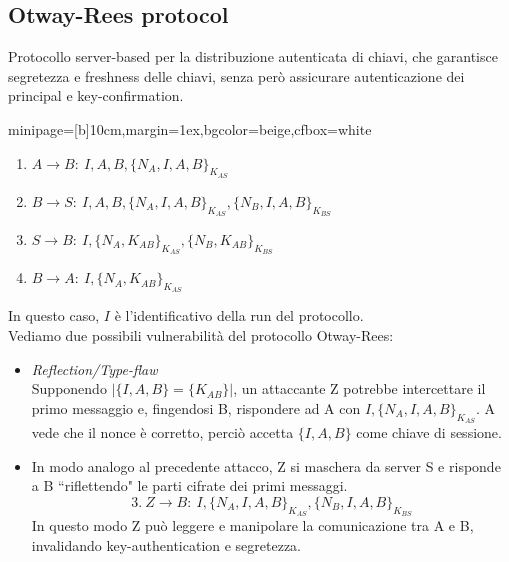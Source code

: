 \documentclass[a4paper, 11pt, twoside, openright, fleqn]{report}
\newcommand{\fromto}[2]{#1\rightarrow #2\!:\ }
\newenvironment{colbox}[2]%
{%
	\par\noindent\hspace{10pt}
	\begin{adjustbox}{minipage=[b]{#2},margin=1ex,bgcolor=#1,cfbox=white}
}{%
	\end{adjustbox}\newline%
}
\begin{document}
\subsection{Otway-Rees protocol}
Protocollo server-based per la distribuzione autenticata di chiavi, che garantisce segretezza e freshness delle chiavi, senza però assicurare autenticazione dei principal e key-confirmation.
\begin{colbox}{beige}{10cm}
	\begin{enumerate}
		\item $\fromto{A}{B}I,A,B,\{N_A,I,A,B\}_{K_{AS}}$
		\item $\fromto{B}{S}I,A,B,\{N_A,I,A,B\}_{K_{AS}},\{N_B,I,A,B\}_{K_{BS}}$
		\item $\fromto{S}{B}I,\{N_A,K_{AB}\}_{K_{AS}},\{N_B,K_{AB}\}_{K_{BS}}$
		\item $\fromto{B}{A}I,\{N_A,K_{AB}\}_{K_{AS}}$
	\end{enumerate}
\end{colbox}
In questo caso, $I$ è l'identificativo della run del protocollo.\\
Vediamo due possibili vulnerabilità del protocollo Otway-Rees:
\begin{itemize}
	\item \emph{Reflection/Type-flaw}\\
	Supponendo $|\{I,A,B\}=\{K_{AB}\}|$, un attaccante Z potrebbe intercettare il primo messaggio e, fingendosi B, rispondere ad A con $I,\{N_A,I,A,B\}_{K_{AS}}$. A vede che il nonce è corretto, perciò accetta $\{I,A,B\}$ come chiave di sessione.
	\item In modo analogo al precedente attacco, Z si maschera da server S e risponde a B ``riflettendo" le parti cifrate dei primi messaggi.
	\begin{equation*}
		3.\ \fromto{Z}{B}I,\{N_A,I,A,B\}_{K_{AS}},\{N_B,I,A,B\}_{K_{BS}}
	\end{equation*}
	In questo modo Z può leggere e manipolare la comunicazione tra A e B, invalidando key-authentication e segretezza.
\end{itemize}
\end{document}
